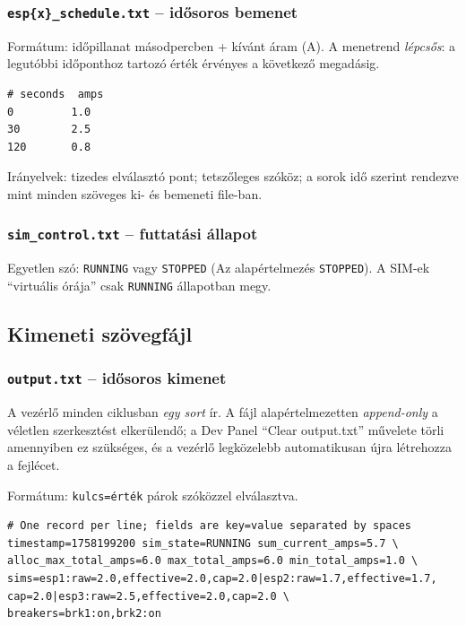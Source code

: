 \subsubsection{\texttt{esp\{x\}\_schedule.txt} -- idősoros bemenet}
Formátum: időpillanat másodpercben + kívánt áram (A). A menetrend \emph{lépcsős}: a legutóbbi időponthoz 
tartozó érték érvényes a következő megadásig.
\begin{verbatim}
# seconds  amps
0         1.0
30        2.5
120       0.8
\end{verbatim}
\noindent Irányelvek: tizedes elválasztó pont; tetszőleges szóköz; a sorok idő 
szerint rendezve mint minden szöveges ki- és bemeneti file-ban.

\subsubsection{\texttt{sim\_control.txt} -- futtatási állapot}
Egyetlen szó: \texttt{RUNNING} vagy \texttt{STOPPED} (Az alapértelmezés \texttt{STOPPED}). 
A SIM-ek ``virtuális órája'' csak \texttt{RUNNING} állapotban megy.

\subsection{Kimeneti szövegfájl}

\subsubsection{\texttt{output.txt} -- idősoros kimenet}
A vezérlő minden ciklusban \emph{egy sort} ír. A fájl alapértelmezetten \emph{append-only} 
a véletlen szerkesztést elkerülendő; a Dev Panel ``Clear output.txt'' művelete törli amennyiben ez szükséges, 
és a vezérlő legközelebb automatikusan újra létrehozza a fejlécet.

\noindent Formátum: \texttt{kulcs=érték} párok szóközzel elválasztva.
\begin{verbatim}
# One record per line; fields are key=value separated by spaces
timestamp=1758199200 sim_state=RUNNING sum_current_amps=5.7 \
alloc_max_total_amps=6.0 max_total_amps=6.0 min_total_amps=1.0 \
sims=esp1:raw=2.0,effective=2.0,cap=2.0|esp2:raw=1.7,effective=1.7,
cap=2.0|esp3:raw=2.5,effective=2.0,cap=2.0 \
breakers=brk1:on,brk2:on
\end{verbatim}

